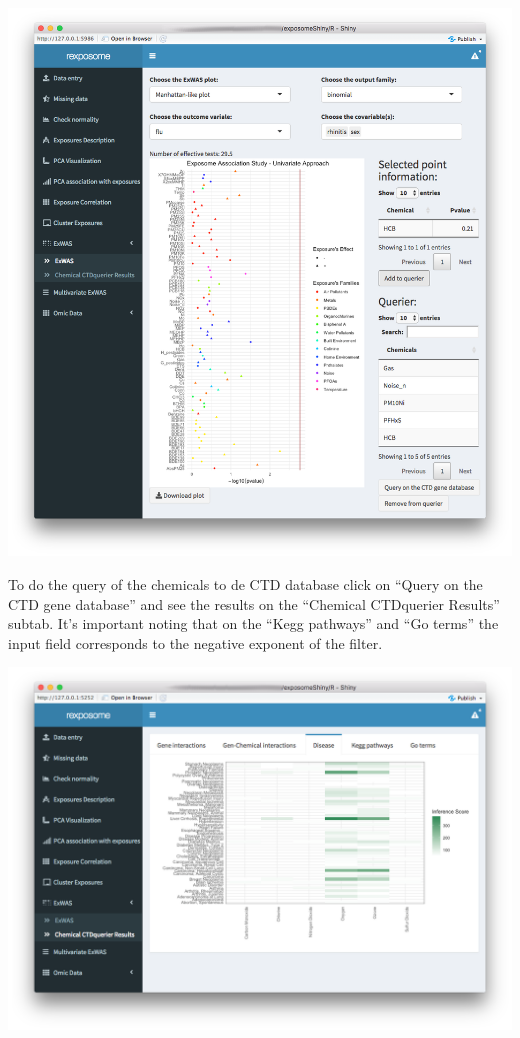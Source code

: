 \documentclass[
]{book}
\begin{document}
\includegraphics{images/analysis7_5.png}

To do the query of the chemicals to de CTD database click on ``Query on the CTD gene database'' and see the results on the ``Chemical CTDquerier Results'' subtab. It's important noting that on the ``Kegg pathways'' and ``Go terms'' the input field corresponds to the negative exponent of the filter.

\includegraphics{images/analysis7_6.png}
\end{document}
